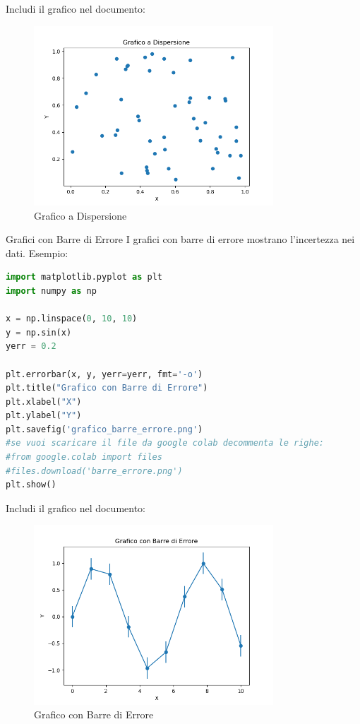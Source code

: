 \documentclass[12pt,a4paper,oneside]{book}
\makeatletter
\renewcommand{\subsection}{\@startsection {subsection}{2}{\z@}
{-3ex \@plus -0.1ex \@minus -.4ex}
{0.5ex \@plus.2ex }
{\color[rgb]{0.141,0.596,0.749}\normalfont\sffamily\bfseries}}
\theoremstyle{esercizio}
\makeatother
\begin{document}
Includi il grafico nel documento:
\begin{figure}[h!]
    \centering
    \includegraphics[width=0.8\textwidth]{grafico_dispersione.png}
    \caption{Grafico a Dispersione}
    \label{fig:grafico_dispersione}
\end{figure}

\subsection{Grafici con Barre di Errore}
I grafici con barre di errore mostrano l'incertezza nei dati. Esempio:
\begin{lstlisting}[language=Python]
import matplotlib.pyplot as plt
import numpy as np

x = np.linspace(0, 10, 10)
y = np.sin(x)
yerr = 0.2

plt.errorbar(x, y, yerr=yerr, fmt='-o')
plt.title("Grafico con Barre di Errore")
plt.xlabel("X")
plt.ylabel("Y")
plt.savefig('grafico_barre_errore.png')
#se vuoi scaricare il file da google colab decommenta le righe:
#from google.colab import files
#files.download('barre_errore.png')
plt.show()
\end{lstlisting}

Includi il grafico nel documento:
\begin{figure}[h!]
    \centering
    \includegraphics[width=0.8\textwidth]{grafico_barre_errore.png}
    \caption{Grafico con Barre di Errore}
    \label{fig:barre_errore}
\end{figure}
\end{document}
